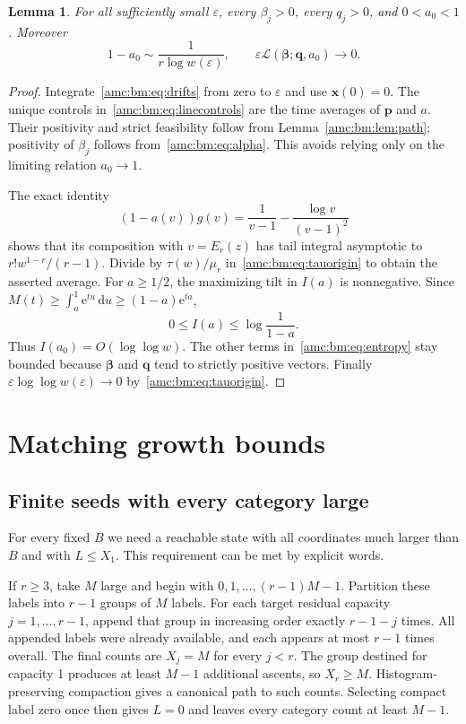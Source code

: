 \documentclass[11pt,letterpaper]{article}
\newtheorem{lemma}[theorem]{Lemma}
\theoremstyle{remark}\newtheorem{remark}[theorem]{Remark}
\newcommand{\ee}{\mathrm e}
\newcommand{\dd}{\,\mathrm d}
\newcommand{\cL}{\mathcal L}
\newcommand{\bx}{\boldsymbol x}
\newcommand{\bp}{\boldsymbol p}
\begin{document}
\begin{lemma}\label{amc:bm:lem:prefixfeasible}
For all sufficiently small $\varepsilon$, every $\beta_j>0$, every $q_j>0$, and $0<a_0<1$. Moreover
\[
 1-a_0\sim\frac1{r\log w(\varepsilon)},\qquad
 \varepsilon\cL(\boldsymbol\beta;\boldsymbol q,a_0)\longrightarrow0.
\]
\end{lemma}
\begin{proof}
Integrate~\eqref{amc:bm:eq:drifts} from zero to $\varepsilon$ and use $\bx(0)=0$. The unique controls in~\eqref{amc:bm:eq:linecontrols} are the time averages of $\bp$ and $a$. Their positivity and strict feasibility follow from Lemma~\ref{amc:bm:lem:path}; positivity of $\beta_j$ follows from~\eqref{amc:bm:eq:alpha}. This avoids relying only on the limiting relation $a_0\to1$.

The exact identity
\[
 (1-a(v))g(v)=\frac1{v-1}-\frac{\log v}{(v-1)^2}
\]
shows that its composition with $v=E_r(z)$ has tail integral asymptotic to $r!w^{1-r}/(r-1)$. Divide by $\tau(w)/\mu_r$ in~\eqref{amc:bm:eq:tauorigin} to obtain the asserted average. For $a\ge1/2$, the maximizing tilt in $I(a)$ is nonnegative. Since $M(t)\ge\int_a^1\ee^{tu}\dd u\ge(1-a)\ee^{ta}$,
\[
 0\le I(a)\le\log\frac1{1-a}.
\]
Thus $I(a_0)=O(\log\log w)$. The other terms in~\eqref{amc:bm:eq:entropy} stay bounded because $\boldsymbol\beta$ and $\boldsymbol q$ tend to strictly positive vectors. Finally $\varepsilon\log\log w(\varepsilon)\to0$ by~\eqref{amc:bm:eq:tauorigin}.
\end{proof}

\section{Matching growth bounds}\label{amc:bm:sec:growth}
\subsection{Finite seeds with every category large}
For every fixed $B$ we need a reachable state with all coordinates much larger than $B$ and with $L\le X_1$. This requirement can be met by explicit words.

If $r\ge3$, take $M$ large and begin with $0,1,\ldots,(r-1)M-1$. Partition these labels into $r-1$ groups of $M$ labels. For each target residual capacity $j=1,\ldots,r-1$, append that group in increasing order exactly $r-1-j$ times. All appended labels were already available, and each appears at most $r-1$ times overall. The final counts are $X_j=M$ for every $j<r$. The group destined for capacity 1 produces at least $M-1$ additional ascents, so $X_r\ge M$. Histogram-preserving compaction gives a canonical path to such counts. Selecting compact label zero once then gives $L=0$ and leaves every category count at least $M-1$.
\end{document}
